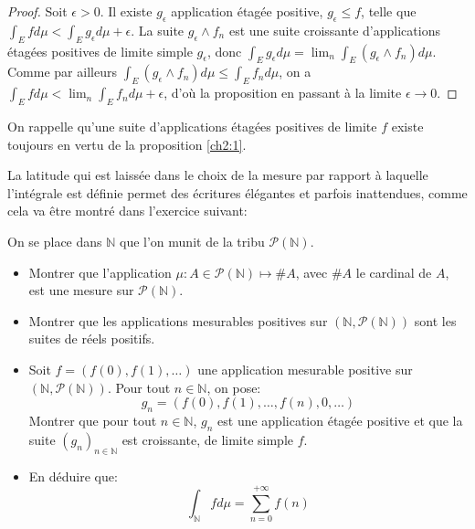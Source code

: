 \begin{proof}
Soit $\epsilon > 0$. Il existe $g_\epsilon$ application étagée
positive, $g_\epsilon \leq f$,  telle que $\int_E f d\mu < \int_E g_{\epsilon} d\mu +
\epsilon$. La suite $g_{\epsilon} \wedge f_n$ est une suite croissante
d'applications étagées positives de limite simple $g_\epsilon$, donc $\int_E g_{\epsilon}
d \mu  = \lim_n \int_E (g_{\epsilon} \wedge f_n) d \mu$. Comme par
ailleurs $\int_E (g_{\epsilon} \wedge f_n) d \mu \leq \int_E f_n d
\mu$, on a $\int_E f d \mu < \lim_n \int_E f_n d \mu + \epsilon$, d'où
la proposition en passant à la limite $\epsilon \to 0$.
\end{proof}
On rappelle qu'une suite d'applications étagées positives de limite $f$ existe
toujours en vertu de la proposition \ref{ch2:1}.


La latitude qui est laissée dans le choix de la mesure par rapport à laquelle
l'intégrale est définie permet des écritures élégantes et parfois inattendues,
comme cela va être montré dans l'exercice suivant:
\begin{exercice}\label{ch3:ex1}
On se place dans $\mathbb{N}$ que l'on munit de la tribu
$\mathcal{P}(\mathbb{N})$. 
\begin{itemize}
  \item Montrer que l'application $\mu \colon A \in \mathcal{P}(\mathbb{N})
  \mapsto \#A$, avec $\#A$ le cardinal de $A$, est une mesure sur
  $\mathcal{P}(\mathbb{N})$.
  \item Montrer que les applications mesurables positives sur
  $\left(\mathbb{N},\mathcal{P}(\mathbb{N})\right)$ sont les suites de réels
  positifs.
  \item Soit $f=\left(f(0),f(1),\dots\right)$ une application mesurable positive
  sur $\left(\mathbb{N},\mathcal{P}(\mathbb{N})\right)$. Pour tout $n \in
  \mathbb{N}$, on pose:
  \[
  g_n = \left(f(0),f(1),\dots,f(n), 0, \dots \right)
  \]
  Montrer que pour tout $n \in \mathbb{N}$, $g_n$ est une application étagée
  positive et que la suite $(g_n)_{n \in \mathbb{N}}$ est croissante, de limite
  simple $f$.
  \item En déduire que:
  \[
  \int_{\mathbb{N}} f d \mu = \sum_{n=0}^{+\infty} f(n)
  \]
\end{itemize}
\end{exercice}

